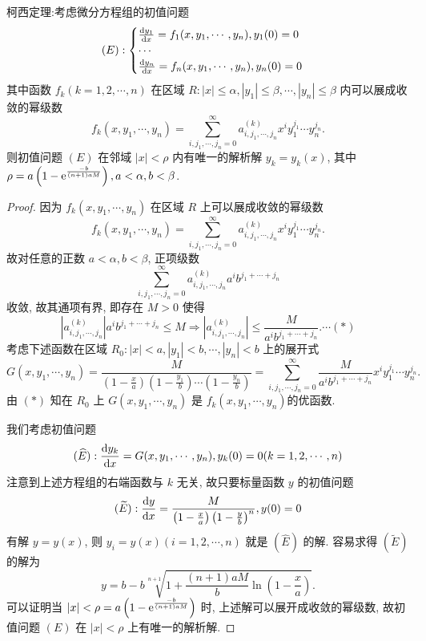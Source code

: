 \begin{solution}
  柯西定理:考虑微分方程组的初值问题
  \[(E):\begin{cases}
  \frac{\mathop{}\!\mathrm{d} y_1}{\mathop{}\!\mathrm{d} x}=f_1(x,y_1,\cdots,y_n),y_1(0)=0\\
  \cdots\\
  \frac{\mathop{}\!\mathrm{d} y_n}{\mathop{}\!\mathrm{d} x}=f_n(x,y_1,\cdots,y_n),y_n(0)=0
  \end{cases}\]
  其中函数 $f_k(k=1,2,\cdots,n)$ 在区域 
  $R:|x|\leq\alpha,|y_1|\leq\beta,\cdots,|y_n|\leq\beta$ 内可以展成收敛的幂级数
  \[f_k(x,y_1,\cdots,y_n)=\sum_{i,j_1,\cdots,j_n=0}^{\infty}a_{i,j_1,\cdots,j_n}^{(k)}x^iy_1^{j_1}\cdots y_n^{j_n}.\]
  则初值问题 $(E)$ 在邻域 $|x|<\rho$ 内有唯一的解析解 $y_k=y_k(x)$, 
  其中 $\displaystyle\rho=a\left(1-\mathrm{e}^{\frac{-b}{(n+1)aM}}\right),a<\alpha,b<\beta$.

  \begin{proof}
    因为 $f_k(x,y_1,\cdots,y_n)$ 在区域 $R$ 上可以展成收敛的幂级数
    \[f_k(x,y_1,\cdots,y_n)=\sum_{i,j_1,\cdots,j_n=0}^{\infty}a_{i,j_1,\cdots,j_n}^{(k)}x^iy_1^{j_1}\cdots y_n^{j_n}.\]
    故对任意的正数 $a<\alpha,b<\beta$, 正项级数
    \[\sum_{i,j_1,\cdots,j_n=0}^{\infty}a_{i,j_1,\cdots,j_n}^{(k)}a^ib^{j_1+\cdots+j_n}\]
    收敛, 故其通项有界, 即存在 $M>0$ 使得
    \[\left|a_{i,j_1,\cdots,j_n}^{(k)}\right|a^ib^{j_1+\cdots+j_n}\leq M\Rightarrow\left|a_{i,j_1,\cdots,j_n}^{(k)}\right|\leq\frac{M}{a^ib^{j_1+\cdots+j_n}}.\cdots(*)\]
    考虑下述函数在区域 $R_0:|x|<a,|y_1|<b,\cdots,|y_n|<b$ 上的展开式
    \[G(x,y_1,\cdots,y_n)
      = \frac{M}{\left(1-\frac{x}{a}\right)\left(1-\frac{y_1}{b}\right)
        \cdots\left(1-\frac{y_n}{b}\right)}
      = \sum_{i,j_1,\cdots,j_n=0}^{\infty}\frac{M}{a^ib^{j_1+\cdots+j_n}}x^iy_1^{j_1}\cdots y_n^{j_n}.\]
    由 $(*)$ 知在 $R_0$ 上 $G(x,y_1,\cdots,y_n)$ 是 $f_k(x,y_1,\cdots,y_n)$的优函数.

    我们考虑初值问题
    \[(\widehat{E}):\frac{\mathop{}\!\mathrm{d} y_k}{\mathop{}\!\mathrm{d} x}=G(x,y_1,\cdots,y_n),y_k(0)=0(k=1,2,\cdots,n)\]
    注意到上述方程组的右端函数与 $k$ 无关, 故只要标量函数 $y$ 的初值问题
    \[(\widetilde{E}):\frac{\mathop{}\!\mathrm{d} y}{\mathop{}\!\mathrm{d} x}
      =\frac{M}{\left(1-\frac{x}{a}\right)\left(1-\frac{y}{b}\right)^n},y(0)=0\]
    有解 $y=y(x)$, 则 $y_i=y(x)(i=1,2,\cdots,n)$ 就是 $(\widehat{E})$ 的解.
    容易求得 $(\widetilde{E})$ 的解为
    \[y=b-b\sqrt[n+1]{1+\frac{(n+1)aM}{b}\ln\left(1-\frac{x}{a}\right)}.\]
    可以证明当 $\displaystyle|x|<\rho=a\left(1-\mathrm{e}^{\frac{-b}{(n+1)aM}}\right)$ 时,
    上述解可以展开成收敛的幂级数, 故初值问题 $(E)$ 在 $|x|<\rho$ 上有唯一的解析解.
  \end{proof}
\end{solution}



